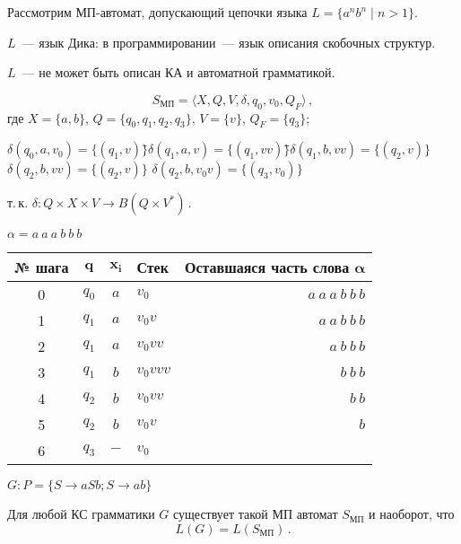 \begin{ex}
  Рассмотрим МП-автомат, допускающий цепочки языка $L = \{a^nb^n \mid
  n>1\}$.

  $L$~--- язык Дика: в программировании~--- язык описания скобочных
  структур.

  $L$~--- не может быть описан КА и автоматной грамматикой.
  
  $$S_{МП} = \langle X,Q,V,\delta,q_0,v_0,Q_F \rangle\,,$$
  где $X = \{a,b\}$, $Q = \{q_0,q_1,q_2,q_3\}$, $V = \{v\}$, $Q_F = \{q_3\}$;
  \begin{tabbing}
    $\delta(q_0,a,v_0) = \{(q_1,v)\}$\qquad\=$\delta(q_1,a,v) =
    \{(q_1,vv)\}$\=\qquad\=$\delta(q_1,b,vv) = \{(q_2,v)\}$\\
    $\delta(q_2,b,vv) = \{(q_2,v)\}$ \>
    $\delta(q_2,b,v_0v)=\{(q_3,v_0)\}$
  \end{tabbing}
  т.\,к. $\delta\colon Q \times X \times V \to B(Q \times V^*)\,.$

  $\alpha = a\ a\ a\ b\ b\ b$

  \begin{table}[h]
    \centering
    \begin{tabular}{c @{\qquad} c @{\qquad} c @{\qquad} l r}
    \hline\hline
    \textbf{№ шага} & $\mathbf{q}$ & $\mathbf{x_i}$ & \textbf{Стек} &
    \textbf{Оставшаяся часть слова} $\boldsymbol{\alpha}$ \\\hline
    0 & $q_0$ & $a$ & $v_0$ & $a\ a\ a\ b\ b\ b$\phantom{\qquad\qquad}\\
    1 & $q_1$ & $a$ & $v_0v$ & $a\ a\ b\ b\ b$\phantom{\qquad\qquad}\\
    2 & $q_1$ & $a$ & $v_0vv$ & $a\ b\ b\ b$\phantom{\qquad\qquad}\\
    3 & $q_1$ & $b$ & $v_0vvv$ & $b\ b\ b$\phantom{\qquad\qquad}\\
    4 & $q_2$ & $b$ & $v_0vv$ & $b\ b$\phantom{\qquad\qquad}\\
    5 & $q_2$ & $b$ & $v_0v$ & $b$\phantom{\qquad\qquad}\\
    6 & $q_3$ & $-$ & $v_0$\\\hline\hline
  \end{tabular}
\end{table}

$G\colon P=\{S \to aSb; S \to ab\}$
\end{ex}

\begin{theorem}
  Для любой КС грамматики $G$ существует такой МП автомат $S_{МП}$ и
  наоборот, что
  $$L(G) = L(S_{МП})\,.$$
\end{theorem}


